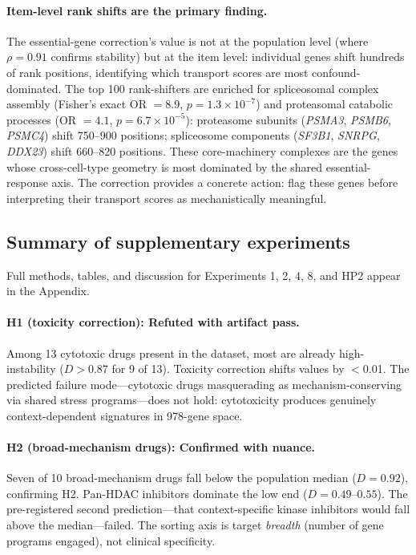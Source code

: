 \documentclass{article}
\begin{document}
\paragraph{Item-level rank shifts are the primary finding.}
The essential-gene correction's value is not at the population level
(where $\rho = 0.91$ confirms stability) but at the item level: individual
genes shift hundreds of rank positions, identifying which transport scores
are most confound-dominated. The top 100 rank-shifters are enriched for
spliceosomal complex assembly (Fisher's exact OR $= 8.9$, $p = 1.3 \times
10^{-7}$) and proteasomal catabolic processes (OR $= 4.1$, $p = 6.7 \times
10^{-5}$): proteasome subunits (\emph{PSMA3}, \emph{PSMB6}, \emph{PSMC4})
shift 750--900 positions; spliceosome components (\emph{SF3B1},
\emph{SNRPG}, \emph{DDX23}) shift 660--820 positions. These core-machinery
complexes are the genes whose cross-cell-type geometry is most dominated by
the shared essential-response axis. The correction provides a concrete
action: flag these genes before interpreting their transport scores as
mechanistically meaningful.

\subsection{Summary of supplementary experiments}

Full methods, tables, and discussion for Experiments 1, 2, 4, 8, and HP2
appear in the Appendix.

\paragraph{H1 (toxicity correction): Refuted with artifact pass.}
Among 13 cytotoxic drugs present in the dataset, most are already
high-instability ($D > 0.87$ for 9 of 13). Toxicity correction shifts
values by $<$0.01. The predicted failure mode---cytotoxic drugs masquerading
as mechanism-conserving via shared stress programs---does not hold: cytotoxicity
produces genuinely context-dependent signatures in 978-gene space.

\paragraph{H2 (broad-mechanism drugs): Confirmed with nuance.}
Seven of 10 broad-mechanism drugs fall below the population median ($D = 0.92$),
confirming H2. Pan-HDAC inhibitors dominate the low end ($D = 0.49$--$0.55$).
The pre-registered second prediction---that context-specific kinase inhibitors
would fall above the median---failed. The sorting axis is target
\emph{breadth} (number of gene programs engaged), not clinical specificity.
\end{document}
